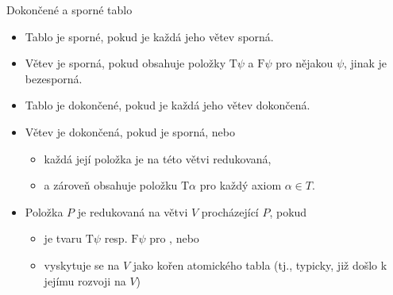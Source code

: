 \documentclass{beamer}
\begin{document}
\begin{frame}{Dokončené a sporné tablo}

    \begin{itemize}[<+->]
        \item Tablo je \alert{sporné}, pokud je každá jeho větev sporná.
        \item Větev je \alert{sporná}, pokud obsahuje položky $\mathrm{T}\psi$ a $\mathrm{F}\psi$ pro nějakou  $\psi$, jinak je \alert{bezesporná}.
        \item Tablo je \alert{dokončené}, pokud je každá jeho větev dokončená.
        \item Větev je \alert{dokončená}, pokud je sporná, nebo
        \begin{itemize}[<+->]
            \item každá její položka je na této větvi \alert{redukovaná},
            \item a zároveň obsahuje položku $\mathrm{T}\alpha$ pro každý axiom $\alpha\in T$.
        \end{itemize}
         
        \item Položka $P$ je \alert{redukovaná} na větvi $V$ procházející $P$, pokud 
        \begin{itemize}[<+->]
            \item je tvaru $\mathrm{T}\psi$ resp. $\mathrm{F}\psi$ pro , nebo
            \item {} vyskytuje se na $V$ jako kořen atomického tabla (tj., typicky, již došlo k jejímu rozvoji na $V$)
        \end{itemize}
    \end{itemize}

\end{frame}
\end{document}
